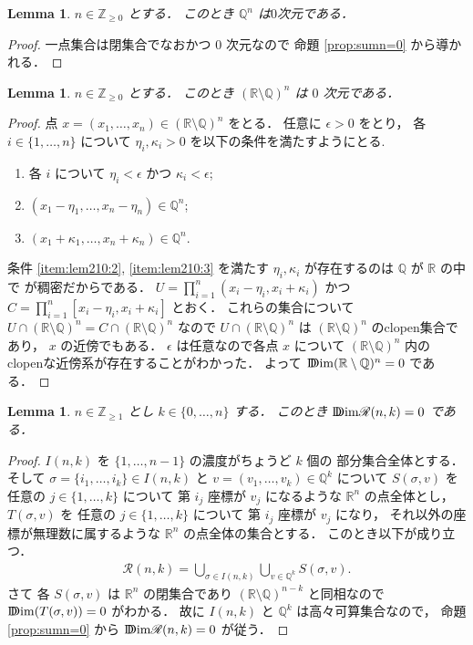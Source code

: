 \documentclass[leqno, a4paper, 12pt]{jsarticle}
\theoremstyle{plain}
\newtheorem{lem}[thm]{Lemma}
\theoremstyle{definition}
\theoremstyle{remark}
\newcommand{\zz}{\mathbb{Z}}
\newcommand{\qq}{\mathbb{Q}}
\newcommand{\rr}{\mathbb{R}}
\newcommand{\yoddim}{\mathrm{D\hspace{-5.5pt}Dim}}
\newcommand{\yospspfont}{\mathscr}
\newcommand{\yorrsp}[2]{\yospspfont{R}({#1}, {#2})}
\numberwithin{equation}{section}
\begin{document}
\begin{lem}\label{lem:qq00}
$n\in \zz_{\ge 0}$
とする．
このとき
$\qq^{n}$
は$0$次元である．
\end{lem}
\begin{proof}
一点集合は閉集合でなおかつ
$0$
次元なので
命題 
\ref{prop:sumn=0}
から導かれる．
\end{proof}


\begin{lem}\label{lem:pp00}
$n\in \zz_{\ge 0}$
とする．
このとき
$(\rr\setminus \qq)^{n}$
は
$0$
次元である．
\end{lem}
\begin{proof}
点
$x=(x_{1}, \dots, x_{n})\in (\rr\setminus \qq)^{n}$
をとる．
任意に
$\epsilon >0$
をとり，
各
$i\in \{1, \dots, n\}$
について
$\eta_{i}, \kappa_{i}>0$
を以下の条件を満たすようにとる.
\begin{enumerate}[label=\textup{(\arabic*)}]
\item\label{item:lem210:1}
各
$i$
について
$\eta_{i}<\epsilon$
かつ
$\kappa_{i}<\epsilon$; 
\item\label{item:lem210:2}
$(x_{1}-\eta_{1}, \dots, x_{n}-\eta_{n})\in \qq^{n}$; 
\item\label{item:lem210:3}
 $(x_{1}+\kappa_{1}, \dots, x_{n}+\kappa_{n})\in \qq^{n}$. 
\end{enumerate}
条件
\ref{item:lem210:2}, \ref{item:lem210:3}
を満たす
$\eta_{i}, \kappa_{i}$
が存在するのは
$\qq$
が
$\rr$
の中で
が稠密だからである．
$U=\prod_{i=1}^{n}(x_{i}-\eta_{i}, x_{i}+\kappa_{i})$
かつ
$C=\prod_{i=1}^{n}[x_{i}-\eta_{i}, x_{i}+\kappa_{i}]$
とおく．
これらの集合について
$U\cap(\rr\setminus \qq)^{n}=C\cap (\rr\setminus \qq)^{n}$
なので
$U\cap(\rr\setminus \qq)^{n}$
は
$(\rr\setminus \qq)^{n}$
のclopen集合であり，
$x$
の近傍でもある．
$\epsilon$
は任意なので各点
$x$
について
$(\rr\setminus \qq)^{n}$
内の
clopenな近傍系が存在することがわかった．
よって
$\yoddim(\rr\setminus \qq)^{n}=0$
である．
\end{proof}

\begin{lem}\label{lem:sum:rrsp}
$n\in \zz_{\ge 1}$
とし
$k\in \{0, \dots, n\}$
する．
このとき
$\yoddim \yorrsp{n}{k} =0$
である．
\end{lem}
\begin{proof}
$I(n, k)$
を
$\{1, \dots, n-1\}$
の濃度がちょうど
$k$
個の
部分集合全体とする．
そして
$\sigma=\{i_{1}, \dots, i_{k}\}\in I(n, k)$
と
$v=(v_{1}, \dots, v_{k})\in \qq^{k}$
について
$S(\sigma, v)$
を
任意の
$j\in \{1, \dots, k\}$
について
第
$i_{j}$
座標が
$v_{j}$
になるような
$\rr^{n}$
の点全体とし，
$T(\sigma, v)$
を
任意の
$j\in \{1, \dots, k\}$
について
第
$i_{j}$
座標が
$v_{j}$
になり，
それ以外の座標が無理数に属するような
$\rr^{n}$
の点全体の集合とする．
このとき以下が成り立つ．
\begin{align}
\yorrsp{n}{k}=\bigcup_{\sigma\in I(n, k)}\bigcup_{v\in \qq^{k}}
S(\sigma, v). 
\end{align}
さて
各
$S(\sigma, v)$
は
$\rr^{n}$
の閉集合であり
$(\rr\setminus \qq)^{n-k}$
と同相なので
$\yoddim (T(\sigma, v))=0$
がわかる．
故に
$I(n, k)$
と
$\qq^{k}$
は高々可算集合なので，
命題 
\ref{prop:sumn=0}
から
$\yoddim \yorrsp{n}{k}=0$
が従う．
\end{proof}
\end{document}
